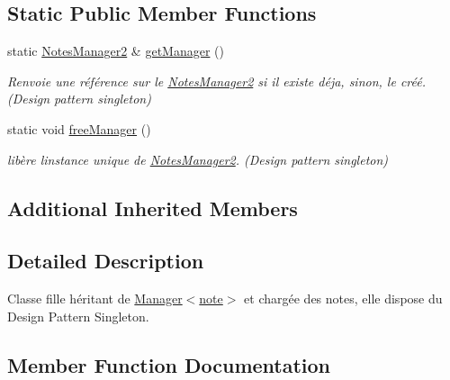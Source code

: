 \subsection*{Static Public Member Functions}
\begin{DoxyCompactItemize}
\item 
\mbox{\label{class_notes_manager2_a392bc750d869bacbe50337531213f248}} 
static \hyperlink{class_notes_manager2}{Notes\+Manager2} \& \hyperlink{class_notes_manager2_a392bc750d869bacbe50337531213f248}{get\+Manager} ()
\begin{DoxyCompactList}\small\item\em Renvoie une référence sur le \hyperlink{class_notes_manager2}{Notes\+Manager2} si il existe déja, sinon, le créé. (Design pattern singleton) \end{DoxyCompactList}\item 
\mbox{\label{class_notes_manager2_abdc16834a0e2ab7c8b3937674c725a0d}} 
static void \hyperlink{class_notes_manager2_abdc16834a0e2ab7c8b3937674c725a0d}{free\+Manager} ()
\begin{DoxyCompactList}\small\item\em libère l\textquotesingle{}instance unique de \hyperlink{class_notes_manager2}{Notes\+Manager2}. (Design pattern singleton) \end{DoxyCompactList}\end{DoxyCompactItemize}
\subsection*{Additional Inherited Members}


\subsection{Detailed Description}
Classe fille héritant de \hyperlink{class_manager}{Manager$<$note$>$} et chargée des notes, elle dispose du Design Pattern Singleton. 

\subsection{Member Function Documentation}
\mbox{\label{class_notes_manager2_a53819d123894c31bbbab66b3d0bf0ff0}} 
